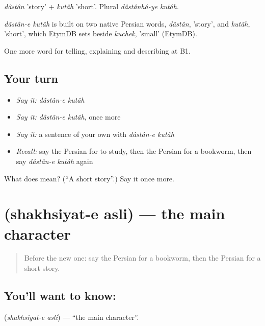\emph{dâstân} 'story' + \emph{kutâh} 'short'. Plural \emph{dâstânhâ-ye kutâh}.

\begin{cousinweb}
\emph{dâstân-e kutâh} is built on two native Persian words, \emph{dâstân}, 'story', and \emph{kutâh}, 'short', which EtymDB sets beside \emph{kuchek}, 'small' (EtymDB).
\end{cousinweb}

\begin{grammarlens}[title={What you've built}]
One more word for telling, explaining and describing at B1.
\end{grammarlens}

\subsection*{Your turn}
\begin{itemize}
\raggedright
  \item \emph{Say it:} \emph{dâstân-e kutâh}
  \item \emph{Say it:} \emph{dâstân-e kutâh}, once more
  \item \emph{Say it:} a sentence of your own with \emph{dâstân-e kutâh}
  \item \emph{Recall:} say the Persian for to study, then the Persian for a bookworm, then say \emph{dâstân-e kutâh} again
\end{itemize}

\begin{tcolorbox}[breakable,colback=teal!4,colframe=teal!35!black,title={Before you move on}]
What does   mean? (\textquotedblleft{}A short story\textquotedblright{}.) Say it once more.
\end{tcolorbox}
\section[\texorpdfstring{\fa{شخصیت} \fa{اصلی} (shakhsiyat-e asli)}{شخصیت اصلی (shakhsiyat-e asli)}]{  (shakhsiyat-e asli) — the main character}

\label{lesson:FA-C530-shakhsiyat-e-asli}



\begin{quote}
Before the new one: say the Persian for a bookworm, then the Persian for a short story.
\end{quote}

\subsection*{You'll want to know:  }
\textbf{ } (\emph{shakhsiyat-e asli}) — \textquotedblleft{}the main character\textquotedblright{}.


